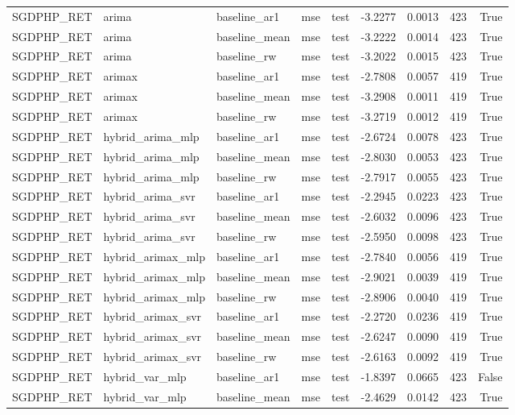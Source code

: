\begin{tabular}{lllllrrrr}
SGDPHP_RET & arima & baseline_ar1 & mse & test & -3.2277 & 0.0013 & 423 & True \\
SGDPHP_RET & arima & baseline_mean & mse & test & -3.2222 & 0.0014 & 423 & True \\
SGDPHP_RET & arima & baseline_rw & mse & test & -3.2022 & 0.0015 & 423 & True \\
SGDPHP_RET & arimax & baseline_ar1 & mse & test & -2.7808 & 0.0057 & 419 & True \\
SGDPHP_RET & arimax & baseline_mean & mse & test & -3.2908 & 0.0011 & 419 & True \\
SGDPHP_RET & arimax & baseline_rw & mse & test & -3.2719 & 0.0012 & 419 & True \\
SGDPHP_RET & hybrid_arima_mlp & baseline_ar1 & mse & test & -2.6724 & 0.0078 & 423 & True \\
SGDPHP_RET & hybrid_arima_mlp & baseline_mean & mse & test & -2.8030 & 0.0053 & 423 & True \\
SGDPHP_RET & hybrid_arima_mlp & baseline_rw & mse & test & -2.7917 & 0.0055 & 423 & True \\
SGDPHP_RET & hybrid_arima_svr & baseline_ar1 & mse & test & -2.2945 & 0.0223 & 423 & True \\
SGDPHP_RET & hybrid_arima_svr & baseline_mean & mse & test & -2.6032 & 0.0096 & 423 & True \\
SGDPHP_RET & hybrid_arima_svr & baseline_rw & mse & test & -2.5950 & 0.0098 & 423 & True \\
SGDPHP_RET & hybrid_arimax_mlp & baseline_ar1 & mse & test & -2.7840 & 0.0056 & 419 & True \\
SGDPHP_RET & hybrid_arimax_mlp & baseline_mean & mse & test & -2.9021 & 0.0039 & 419 & True \\
SGDPHP_RET & hybrid_arimax_mlp & baseline_rw & mse & test & -2.8906 & 0.0040 & 419 & True \\
SGDPHP_RET & hybrid_arimax_svr & baseline_ar1 & mse & test & -2.2720 & 0.0236 & 419 & True \\
SGDPHP_RET & hybrid_arimax_svr & baseline_mean & mse & test & -2.6247 & 0.0090 & 419 & True \\
SGDPHP_RET & hybrid_arimax_svr & baseline_rw & mse & test & -2.6163 & 0.0092 & 419 & True \\
SGDPHP_RET & hybrid_var_mlp & baseline_ar1 & mse & test & -1.8397 & 0.0665 & 423 & False \\
SGDPHP_RET & hybrid_var_mlp & baseline_mean & mse & test & -2.4629 & 0.0142 & 423 & True \\

\end{tabular}
